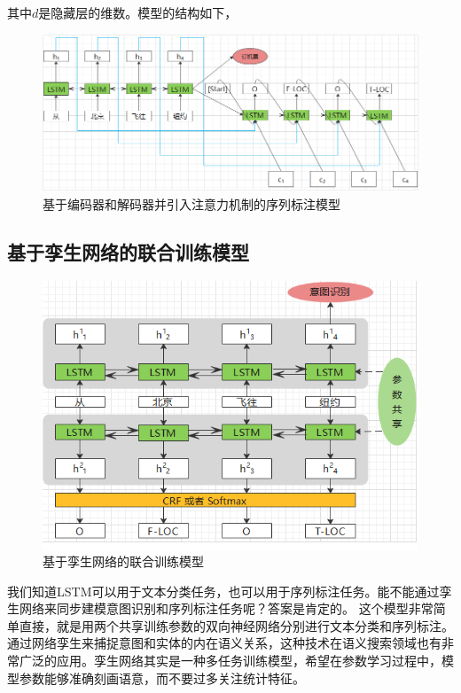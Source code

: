 \documentclass[twoside,a4paper,12pt]{book}%
\begin{document}
其中$d$是隐藏层的维数。模型的结构如下，
\begin{figure}[htbp]
\begin{center}
\includegraphics[width=5.6in]{figures/seq2seq_sf_id2.png}
\caption{基于编码器和解码器并引入注意力机制的序列标注模型}
\label{fig:seq2seq_sf_id2}
\end{center}
\end{figure}

\subsection{基于孪生网络的联合训练模型}
\begin{figure}[htbp]
\begin{center}
\includegraphics[width=5.0in]{figures/seq2seq_sf_id3.png}
\caption{基于孪生网络的联合训练模型}
\label{fig:seq2seq_sf_id3}
\end{center}
\end{figure}
我们知道\gls{LSTM}可以用于文本分类任务，也可以用于序列标注任务。能不能通过孪生网络来同步建模意图识别和序列标注任务呢？答案是肯定的。
这个模型非常简单直接，就是用两个共享训练参数的双向神经网络分别进行文本分类和序列标注。通过网络孪生来捕捉意图和实体的内在语义关系，这种技术在语义搜索领域也有非常广泛的应用。孪生网络其实是一种多任务训练模型，希望在参数学习过程中，模型参数能够准确刻画语意，而不要过多关注统计特征。
\end{document}
